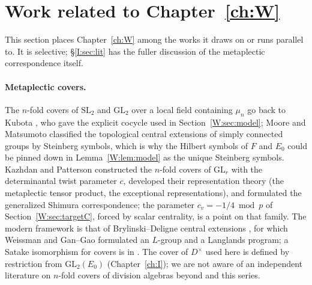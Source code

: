 \section{Work related to \texorpdfstring{Chapter~\ref{ch:W}}{Chapter 8}}\label{W:sec:literature}
This section places Chapter~\ref{ch:W} among the works it draws on or runs
parallel to.  It is selective; \S\ref{I:sec:lit} has the fuller
discussion of the metaplectic correspondence itself.

\paragraph{Metaplectic covers.}  The $n$-fold covers of $\mathrm{SL}_2$
and $\mathrm{GL}_2$ over a local field containing $\mu_n$ go back to
Kubota \cite{Kub67,Kub69}, who gave the explicit cocycle used in
Section~\ref{W:sec:model}; Moore \cite{Moo68} and Matsumoto classified the
topological central extensions of simply connected groups by Steinberg
symbols, which is why the Hilbert symbols of $F$ and $E_0$ could be
pinned down in Lemma~\ref{W:lem:model} as the unique Steinberg symbols.
Kazhdan and Patterson \cite{KP84} constructed the $n$-fold covers of
$\mathrm{GL}_r$ with the determinantal twist parameter $c$, developed
their representation theory (the metaplectic tensor product, the
exceptional representations), and formulated the generalized Shimura
correspondence; the parameter $c_v=-1/4\bmod p$ of
Section~\ref{W:sec:targetC}, forced by scalar centrality, is a point on
that family.  The modern framework is that of Brylinski--Deligne
central extensions \cite{BD01}, for which Weissman \cite{Wei18} and Gan--Gao
\cite{GG18} formulated an $L$-group and a Langlands program; a Satake
isomorphism for covers is in \cite{McN12,Gao18}.  The cover of $D^\times$ used
here is defined by restriction from $\mathrm{GL}_2(E_0)$ (Chapter~\ref{ch:I}); we are
not aware of an independent literature on $n$-fold covers of division
algebras beyond \cite{JC26a} and this series.

